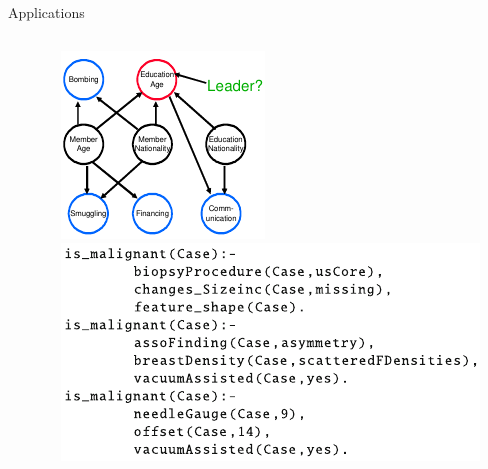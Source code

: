 \documentclass{beamer}
\begin{document}
\begin{frame}{Applications}
\begin{columns}
\begin{column}{0.5\textwidth}
      \\[-7pt]
      {\tiny \cite{DBLP:conf/aaai/CarlsonBKSHM10}}
    \end{column}
    \begin{column}{0.5\textwidth}
      \centering
      \includegraphics[width=\textwidth,height=0.4\textheight,keepaspectratio]{application_criminal.jpg}
      \\[-7pt]
      {\tiny \cite{DBLP:conf/sdm/DelaneyFCWJ10}}
      \vfill
      \null
      \includegraphics[width=\textwidth,height=0.5\textheight,keepaspectratio]{application_cancer.jpg}
      \\[-7pt]
      {\tiny \cite{DBLP:conf/ilp/Corte-RealD017}}
    \end{column}
  \end{columns}
\end{frame}
\end{document}
